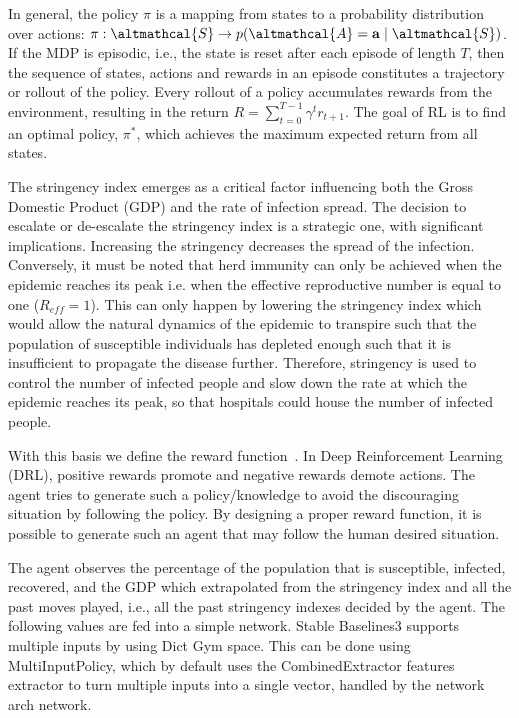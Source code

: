 \documentclass[tikz,fleqn,12pt]{wlscirep}
\begin{document}
In general, the policy $\pi$ is a mapping from states to a probability distribution over actions: $\pi: \altmathcal{S} \rightarrow p(\altmathcal{A}=\mathbf{a} \mid \altmathcal{S})$. If the MDP is episodic, i.e., the state is reset after each episode of length $T$, then the sequence of states, actions and rewards in an episode constitutes a trajectory or rollout of the policy. Every rollout of a policy accumulates rewards from the environment, resulting in the return $R=\sum_{t=0}^{T-1} \gamma^t r_{t+1}$. The goal of RL is to find an optimal policy, $\pi^*$, which achieves the maximum expected return from all states.

The stringency index emerges as a critical factor influencing both the Gross Domestic Product (GDP) and the rate of infection spread. The decision to escalate or de-escalate the stringency index is a strategic one, with significant implications. Increasing the stringency decreases the spread of the infection. Conversely, it must be noted that herd immunity can only be achieved when the epidemic reaches its peak i.e. when the effective reproductive number is equal to one ($R_{eff} = 1$). This can only happen by lowering the stringency index which would allow the natural dynamics of the epidemic to transpire such that the population of susceptible individuals has depleted enough such that it is insufficient to propagate the disease further. Therefore, stringency is used to control the number of infected people and slow down the rate at which the epidemic reaches its peak, so that hospitals could house the number of infected people.

With this basis we define the reward function~\cite{Ohi2020}. In Deep Reinforcement Learning (DRL), positive rewards promote and negative rewards demote actions. The agent tries to generate such a policy/knowledge to avoid the discouraging situation by following the policy. By designing a proper reward function, it is possible to generate such an agent that may follow the human desired situation.

The agent observes the percentage of the population that is susceptible, infected, recovered, and the GDP which extrapolated from the stringency index and all the past moves played, i.e., all the past stringency indexes decided by the agent. The following values are fed into a simple network. Stable Baselines3 supports multiple inputs by using Dict Gym space. This can be done using MultiInputPolicy, which by default uses the CombinedExtractor features extractor to turn multiple inputs into a single vector, handled by the network arch network.
\end{document}

